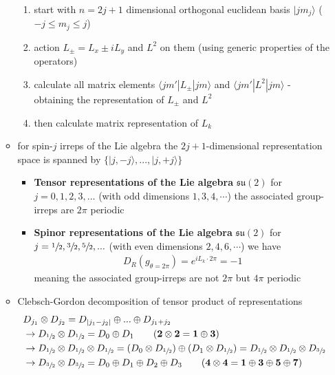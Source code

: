 \documentclass[10pt,a4paper]{report}
\theoremstyle{definition}
\begin{document}
\begin{itemize}
\begin{itemize}
\begin{enumerate}
\item start with $n=2j+1$ dimensional orthogonal euclidean basis $|jm_j\rangle$ ($-j\le m_j\le j$)
\item action $L_\pm=L_x\pm iL_y$ and $L^2$ on them (using generic properties of the operators) 
\item calculate all matrix elements $\langle jm'|L_\pm|jm\rangle$ and $\langle jm'|L^2|jm\rangle$ - obtaining the representation of $L_\pm$ and $L^2$
\item then calculate matrix representation of $L_k$
\end{enumerate}
\item for spin-$j$ irreps of the Lie algebra the $2j+1$-dimensional representation space is spanned by $\{|j,-j\rangle, ...,|j,+j\rangle\}$
\begin{itemize}
\item {\bf Tensor representations of the Lie algebra} $\mathfrak{su}(2)$ for $j=0,1,2,3,...$ (with odd dimensions $1,3,4,\cdots$) the associated group-irreps are $2\pi$ periodic
\item {\bf Spinor representations of the Lie algebra} $\mathfrak{su}(2)$ for $j=\sfrac{1}{2},\sfrac{3}{2},\sfrac{5}{2},...$ (with even dimensions $2,4,6,\cdots$) we have
\begin{align}
D_R(g_{\theta=2\pi})=e^{iL_k\cdot 2\pi}=-1
\end{align}
meaning the associated group-irreps are not $2\pi$ but $4\pi$ periodic
\end{itemize}
\item Clebsch-Gordon decomposition of tensor product of representations
\begin{align}
&D_{j_1}\otimes D_{j_2}=D_{|j_1-j_2|}\oplus...\oplus D_{j_1+j_2}\\
&\rightarrow D_{\sfrac{1}{2}}\otimes D_{\sfrac{1}{2}}=D_0\oplus D_1\qquad(\mathbf{2\otimes2=1\oplus3})\\
&\rightarrow D_{\sfrac{1}{2}}\otimes D_{\sfrac{1}{2}}\otimes D_{\sfrac{1}{2}}=(D_0\otimes D_{\sfrac{1}{2}})\oplus (D_1\otimes D_{\sfrac{1}{2}})=D_{\sfrac{1}{2}}\otimes D_{\sfrac{1}{2}} \otimes D_{\sfrac{3}{2}}\\
&\rightarrow D_{\sfrac{3}{2}}\otimes D_{\sfrac{3}{2}}=D_0\oplus D_1\oplus D_2\oplus D_3\qquad(\mathbf{4\otimes4=1\oplus3\oplus5\oplus7})
\end{align}

\end{itemize}


\end{itemize}
\end{document}
